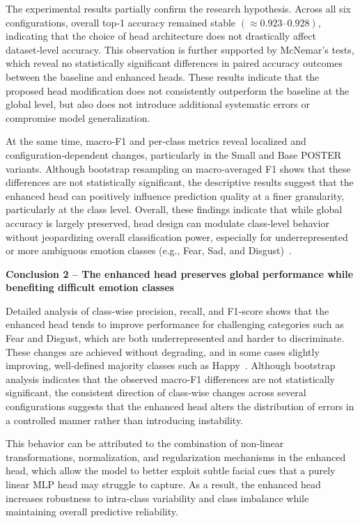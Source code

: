 The experimental results partially confirm the research hypothesis. Across all six configurations, overall top‑1 accuracy remained stable $(\approx 0.923–0.928)$, indicating that the choice of head architecture does not drastically affect dataset‑level accuracy. This observation is further supported by McNemar’s tests, which reveal no statistically significant differences in paired accuracy outcomes between the baseline and enhanced heads. These results indicate that the proposed head modification does not consistently outperform the baseline at the global level, but also does not introduce additional systematic errors or compromise model generalization.


At the same time, macro‑F1 and per‑class metrics reveal localized and configuration‑dependent changes, particularly in the Small and Base \gls{POSTER} variants. Although bootstrap resampling on macro‑averaged F1 shows that these differences are not statistically significant, the descriptive results suggest that the enhanced head can positively influence prediction quality at a finer granularity, particularly at the class level. Overall, these findings indicate that while global accuracy is largely preserved, head design can modulate class‑level behavior without jeopardizing overall classification power, especially for underrepresented or more ambiguous emotion classes (e.g., Fear, Sad, and Disgust)~\cite{kollias_affect_2021, zhang_leave_2023, wang_survey_2024}.

\textbf{Conclusion 2 – The enhanced head preserves global performance while benefiting difficult emotion classes}

Detailed analysis of class‑wise precision, recall, and F1‑score shows that the enhanced head tends to improve performance for challenging categories such as Fear and Disgust, which are both underrepresented and harder to discriminate. These changes are achieved without degrading, and in some cases slightly improving, well‑defined majority classes such as Happy~\cite{kollias_affect_2021, zhang_leave_2023, wang_survey_2024}. Although bootstrap analysis indicates that the observed macro‑F1 differences are not statistically significant, the consistent direction of class‑wise changes across several configurations suggests that the enhanced head alters the distribution of errors in a controlled manner rather than introducing instability.


This behavior can be attributed to the combination of non‑linear transformations, normalization, and regularization mechanisms in the enhanced head, which allow the model to better exploit subtle facial cues that a purely linear MLP head may struggle to capture. As a result, the enhanced head increases robustness to \gls{intra-class} variability and class imbalance while maintaining overall predictive reliability.


